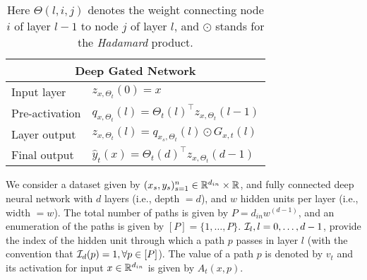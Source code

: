 \begin{table}[!htb]
\begin{minipage}{0.5\columnwidth}
{\begin{tabular}{|l|l|}
\multicolumn{2}{|c|}{Deep Gated Network}\\\hline 
Input layer & $z_{x,\Theta_t}(0)=x$ \\\hline
Pre-activation & $q_{x,\Theta_t}(l)={\Theta_t(l)}^\top z_{x,\Theta_t}(l-1)$\\\hline
Layer output & $z_{x,\Theta_t}(l)=q_{x_s,\Theta_t}(l)\odot G_{x,t}(l)$ \\\hline
Final output & $\hat{y}_t(x)={\Theta_t(d)}^\top z_{x,\Theta_t}(d-1)$\\\hline
\end{tabular}
}
\end{minipage}
\caption{Here $\Theta(l,i,j)$ denotes the weight connecting node $i$ of layer $l-1$ to node $j$ of layer $l$, and $\odot$ stands for the \emph{Hadamard} product.}
\label{tb:dgn-path}
\end{table}
We consider a dataset given by $(x_s,y_s)_{s=1}^n\in \mathbb{R}^{d_{in}}\times \mathbb{R}$, and fully connected deep neural network with $d$ layers (i.e., depth $=d$), and $w$ hidden units per layer (i.e., width $=w$). The total number of paths is given by $P=d_{in}w^{(d-1)}$, and an enumeration of the paths is given by $[P]=\{1,\ldots,P\}$.  $\mathcal{I}_{l},l=0,\ldots,d-1$, provide the index of the hidden unit through which a path $p$ passes in layer $l$ (with the convention that $\mathcal{I}_d(p)=1,\forall p\in [P]$). The value of a path $p$ is denoted by $v_t$ and its activation for input $x\in \mathbb{R}^{d_{in}}$ is given by $A_t(x,p)$. 

